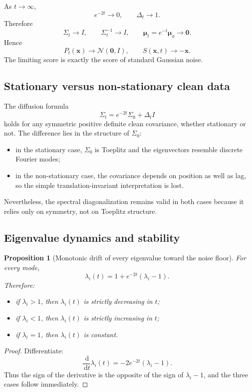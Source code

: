 \documentclass[11pt]{article}
\numberwithin{equation}{section}
\newtheorem{proposition}[theorem]{Proposition}
\theoremstyle{definition}
\theoremstyle{remark}
\newcommand{\Id}{I}
\newcommand{\diff}{\,\mathrm{d}}
\newcommand{\Ncal}{\mathcal{N}}
\begin{document}
As $t\to\infty$,
\[
e^{-2t}\to 0,\qquad \Delta_t\to 1.
\]
Therefore
\[
\Sigma_t\to \Id,\qquad \Sigma_t^{-1}\to \Id,\qquad \boldsymbol{\mu}_t=e^{-t}\boldsymbol{\mu}_a\to \mathbf 0.
\]
Hence
\[
P_t(\mathbf x)\to \Ncal(\mathbf 0,\Id),
\qquad
S(\mathbf x,t)\to -\mathbf x.
\]
The limiting score is exactly the score of standard Gaussian noise.

\subsection{Stationary versus non-stationary clean data}

The diffusion formula
\[
\Sigma_t=e^{-2t}\Sigma_0+\Delta_t\Id
\]
holds for any symmetric positive definite clean covariance, whether stationary or not. The difference lies in the structure of $\Sigma_0$:
\begin{itemize}[leftmargin=1cm]
\item in the stationary case, $\Sigma_0$ is Toeplitz and the eigenvectors resemble discrete Fourier modes;
\item in the non-stationary case, the covariance depends on position as well as lag, so the simple translation-invariant interpretation is lost.
\end{itemize}
Nevertheless, the spectral diagonalization remains valid in both cases because it relies only on symmetry, not on Toeplitz structure.

\subsection{Eigenvalue dynamics and stability}

\begin{proposition}[Monotonic drift of every eigenvalue toward the noise floor]\label{prop:eig_monotone}
For every mode,
\[
\lambda_i(t)=1+e^{-2t}(\lambda_i-1).
\]
Therefore:
\begin{itemize}[leftmargin=1cm]
\item if $\lambda_i>1$, then $\lambda_i(t)$ is strictly decreasing in $t$;
\item if $\lambda_i<1$, then $\lambda_i(t)$ is strictly increasing in $t$;
\item if $\lambda_i=1$, then $\lambda_i(t)$ is constant.
\end{itemize}
\end{proposition}

\begin{proof}
Differentiate:
\[
\frac{\diff}{\diff t}\lambda_i(t)
=
-2e^{-2t}(\lambda_i-1).
\]
Thus the sign of the derivative is the opposite of the sign of $\lambda_i-1$, and the three cases follow immediately.
\end{proof}
\end{document}

